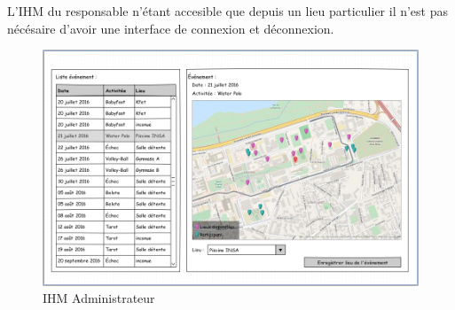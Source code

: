 \documentclass[a4paper,11pt]{article}
\begin{document}
L'IHM du responsable n'étant accesible que depuis un lieu particulier il n'est pas nécésaire d'avoir une interface de connexion et déconnexion.

\begin{figure}[H]
  \begin{center}
    \includegraphics[width=15cm]{../../IHM/IHM_responsable.png}
    \caption{IHM Administrateur}
  \end{center}
\end{figure}
\end{document}
